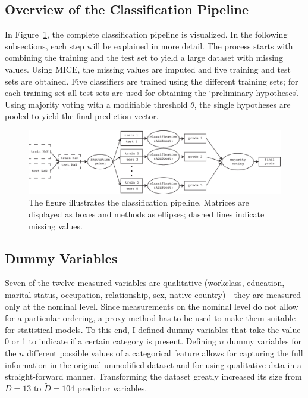 \documentclass[a4paper]{article}
\begin{document}
\subsection{Overview of the Classification Pipeline}

In Figure~\ref{fig:pipeline}, the complete classification pipeline is
visualized. In the following subsections, each step will be explained
in more detail. The process starts with combining the training and the
test set to yield a large dataset with missing values. Using MICE, the
missing values are imputed and five training and test sets are
obtained. Five classifiers are trained using the different training
sets; for each training set all test sets are used for obtaining the
`preliminary hypotheses'. Using majority voting with a modifiable
threshold $\theta$, the single hypotheses are pooled to yield the
final prediction vector.

\begin{figure}[h!]
\begin{center}
\includegraphics[width=1\columnwidth]{pipeline}
\caption{{\label{fig:pipeline} The figure illustrates the
    classification pipeline. Matrices are displayed as boxes and
    methods as ellipses; dashed lines indicate missing values.%
  }}
\end{center}
\end{figure}

\subsection{Dummy Variables}

Seven of the twelve measured variables are qualitative (workclass,
education, marital status, occupation, relationship, sex, native
country)---they are measured only at the nominal level. Since
measurements on the nominal level do not allow for a particular
ordering, a proxy method has to be used to make them suitable for
statistical models. To this end, I defined dummy variables that take
the value 0 or 1 to indicate if a certain category is
present. Defining $n$ dummy variables for the $n$ different possible
values of a categorical feature allows for capturing the full
information in the original unmodified dataset and for using
qualitative data in a straight-forward manner.
Transforming the dataset greatly increased its size from $D = 13$ to
$\tilde{D} = 104$ predictor variables.
\end{document}
